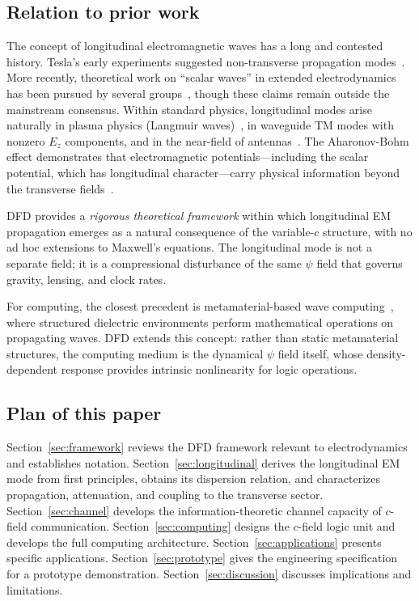 \documentclass[aps,prd,twocolumn,superscriptaddress,nofootinbib,floatfix]{revtex4-2}
\newcommand{\psifield}{\psi}
\begin{document}
\subsection{Relation to prior work}

The concept of longitudinal electromagnetic waves has a long and
contested history. Tesla's early experiments suggested non-transverse
propagation modes~\cite{Tesla1904}. More recently, theoretical work
on ``scalar waves'' in extended electrodynamics has been pursued by
several groups~\cite{Meyl2003,Monstein2002}, though these claims
remain outside the mainstream consensus.
Within standard physics, longitudinal modes arise naturally in
plasma physics (Langmuir waves)~\cite{Chen1984}, in waveguide
TM modes with nonzero $E_z$ components, and in the near-field
of antennas~\cite{Jackson1998}. The Aharonov-Bohm effect
demonstrates that electromagnetic potentials---including the
scalar potential, which has longitudinal character---carry
physical information beyond the transverse fields~\cite{Aharonov1959}.

DFD provides a \emph{rigorous theoretical framework} within which
longitudinal EM propagation emerges as a natural consequence of
the variable-$c$ structure, with no ad hoc extensions to Maxwell's
equations. The longitudinal mode is not a separate field; it is a
compressional disturbance of the same $\psifield$ field that
governs gravity, lensing, and clock rates.

For computing, the closest precedent is metamaterial-based wave
computing~\cite{Silva2014,Estakhri2019}, where structured dielectric
environments perform mathematical operations on propagating waves.
DFD extends this concept: rather than static metamaterial structures,
the computing medium is the dynamical $\psifield$ field itself,
whose density-dependent response provides intrinsic nonlinearity
for logic operations.

\subsection{Plan of this paper}

Section~\ref{sec:framework} reviews the DFD framework relevant to
electrodynamics and establishes notation.
Section~\ref{sec:longitudinal} derives the longitudinal EM mode
from first principles, obtains its dispersion relation, and
characterizes propagation, attenuation, and coupling to the
transverse sector.
Section~\ref{sec:channel} develops the information-theoretic
channel capacity of $c$-field communication.
Section~\ref{sec:computing} designs the $c$-field logic unit and
develops the full computing architecture.
Section~\ref{sec:applications} presents specific applications.
Section~\ref{sec:prototype} gives the engineering specification
for a prototype demonstration.
Section~\ref{sec:discussion} discusses implications and limitations.
\end{document}
